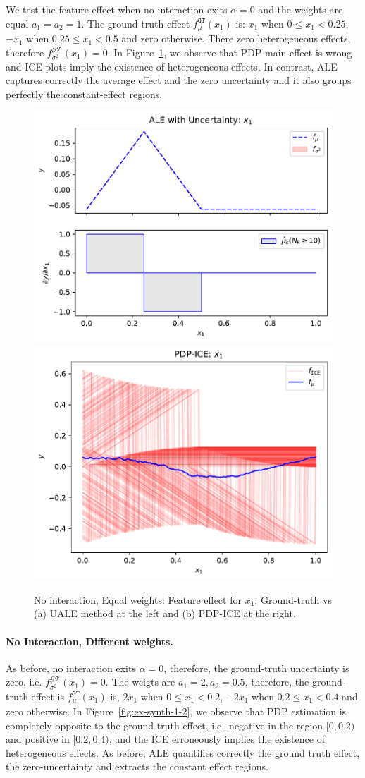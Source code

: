 \documentclass[twoside]{article}
\begin{document}
We test the feature effect when no interaction exits \(\alpha=0\) and
the weights are equal \(a_1=a_2=1\). The ground truth effect
\(f_\mu^{\mathtt{GT}}(x_1)\) is: \(x_1\) when \(0 \leq x_1 < 0.25\),
\(-x_1\) when \(0.25 \leq x_1 < 0.5\) and zero otherwise. There zero
heterogeneous effects, therefore
\(f^{\mathcal{GT}}_{\sigma^2}(x_1) = 0\). In
Figure~\ref{fig:synth-ex-1-case-1}, we observe that PDP main effect is
wrong and ICE plots imply the existence of heterogeneous effects. In
contrast, ALE captures correctly the average effect and the zero
uncertainty and it also groups perfectly the constant-effect regions.

\begin{figure}[h]
  \centering
  \includegraphics[width=.23\textwidth]{example_1/dale_feat_0.pdf}
  \includegraphics[width=.23\textwidth]{example_1/pdp_ice_feat_0.pdf}
  \caption{No interaction, Equal weights: Feature effect for \(x_1\);
    Ground-truth vs (a) UALE method at the left and (b) PDP-ICE at the
    right.}
  \label{fig:synth-ex-1-case-1}
\end{figure}

\paragraph{No Interaction, Different weights.}

As before, no interaction exits \(\alpha=0\), therefore, the
ground-truth uncertainty is zero, i.e.
\(f^{\mathcal{GT}}_{\sigma^2}(x_1) = 0\). The weigts are
\(a_1=2, a_2=0.5\), therefore, the ground-truth effect is
\(f_\mu^{\mathtt{GT}}(x_1)\) is, \(2x_1\) when \(0 \leq x_1 < 0.2\),
\(-2x_1\) when \(0.2 \leq x_1 < 0.4\) and zero otherwise. In
Figure~\ref{fig:ex-synth-1-2}, we observe that PDP estimation is
completely opposite to the ground-truth effect, i.e.~negative in the
region \([0, 0.2)\) and positive in \([0.2, 0.4)\), and the ICE
erroneously implies the existence of heterogeneous effects. As before,
ALE quantifies correctly the ground truth effect, the
zero-uncertainty and extracts the constant effect regions.
\end{document}
